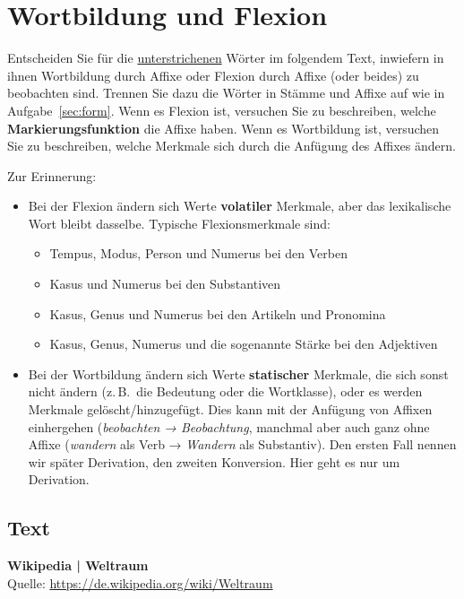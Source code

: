 \documentclass[12pt,a4paper,twoside]{article}
\newcommand{\zB}{z.\,B.\ }
\newcommand{\Lf}{
  \setlength{\itemsep}{1pt}
  \setlength{\parskip}{0pt}
  \setlength{\parsep}{0pt}
}
\begin{document}
\section{Wortbildung und Flexion}\label{sec:funktion}

Entscheiden Sie für die \ul{unterstrichenen} Wörter im folgendem Text, inwiefern in ihnen Wortbildung durch Affixe oder Flexion durch Affixe (oder beides) zu beobachten sind.
Trennen Sie dazu die Wörter in Stämme und Affixe auf wie in Aufgabe~\ref{sec:form}.
Wenn es Flexion ist, versuchen Sie zu beschreiben, welche \textbf{Markierungsfunktion} die Affixe haben.
Wenn es Wortbildung ist, versuchen Sie zu beschreiben, welche Merkmale sich durch die Anfügung des Affixes ändern.

Zur Erinnerung:

\begin{itemize}
  \item Bei der Flexion ändern sich Werte \textbf{volatiler} Merkmale, aber das lexikalische Wort bleibt dasselbe.
    Typische Flexionsmerkmale sind:
    \begin{itemize}\Lf
      \item Tempus, Modus, Person und Numerus bei den Verben
      \item Kasus und Numerus bei den Substantiven
      \item Kasus, Genus und Numerus bei den Artikeln und Pronomina
      \item Kasus, Genus, Numerus und die sogenannte Stärke bei den Adjektiven
    \end{itemize}
  \item Bei der Wortbildung ändern sich Werte \textbf{statischer} Merkmale, die sich sonst nicht ändern (\zB die Bedeutung oder die Wortklasse), oder es werden Merkmale gelöscht\slash hinzugefügt.
    Dies kann mit der Anfügung von Affixen einhergehen (\textit{beobachten → \textit{Beobachtung}}, manchmal aber auch ganz ohne Affixe (\textit{wandern} als Verb → \textit{Wandern} als Substantiv).
    Den ersten Fall nennen wir später Derivation, den zweiten Konversion.
    Hier geht es nur um Derivation.
\end{itemize}

\subsection{Text}

\textbf{Wikipedia | Weltraum}\\
\footnotesize Quelle: \url{https://de.wikipedia.org/wiki/Weltraum}\\
\end{document}

